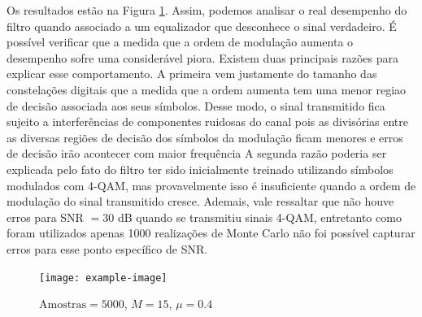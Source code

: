 \begin{enumerate}
        Os resultados estão na Figura \ref{fig:L3Q6D}. Assim, podemos analisar o real desempenho do filtro quando associado a um equalizador que desconhece o sinal verdadeiro. 
        É possível verificar que a medida que a ordem de modulação aumenta o desempenho sofre uma considerável piora. Existem duas principais razões para explicar esse comportamento. A primeira vem justamente 
        do tamanho das constelações digitais que a medida que a ordem aumenta tem uma menor regiao de decisão associada aos seus símbolos. Desse modo, o sinal transmitido fica sujeito a interferências de componentes 
        ruidosas do canal pois as divisórias entre as diversas regiões de decisão dos símbolos da modulação ficam menores e erros de decisão irão acontecer com maior frequência A segunda razão poderia ser explicada pelo 
        fato do filtro ter sido inicialmente treinado utilizando símbolos modulados com 4-QAM, mas provavelmente isso é insuficiente quando a ordem de modulação do sinal transmitido cresce.
        Ademais, vale ressaltar que não houve erros para SNR $= 30$ dB quando se transmitiu sinais 4-QAM, entretanto como foram utilizados apenas 1000 realizações de Monte Carlo não foi
        possível capturar erros para esse ponto específico de SNR.

        
    \begin{figure}[!htp]
        \centering
        \texttt{[image: example-image]}
        \caption{$\text{Amostras} = 5000$, $M = 15$, $\mu = 0.4$}
        \label{fig:L3Q6D}
    \end{figure}


\end{enumerate}
